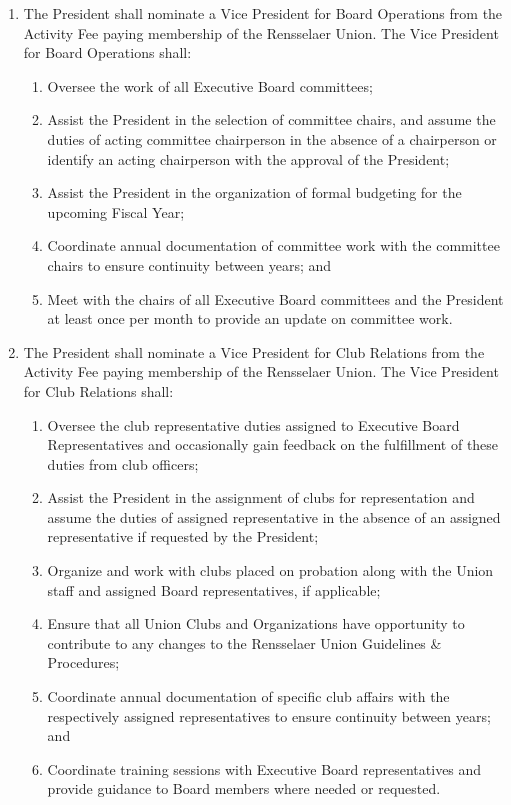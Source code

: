 \documentclass{uniondoc}
\begin{document}
\begin{enumerate}
\begin{enumerate}
  \end{enumerate}
\item The President shall nominate a Vice President for Board Operations from the Activity Fee paying membership of the Rensselaer Union. The Vice President for Board Operations shall:
  \begin{enumerate}
  \item Oversee the work of all Executive Board committees;
  \item Assist the President in the selection of committee chairs, and assume the duties of acting committee chairperson in the absence of a chairperson or identify an acting chairperson with the approval of the President;
  \item Assist the President in the organization of formal budgeting for the upcoming Fiscal Year;
  \item Coordinate annual documentation of committee work with the committee chairs to ensure continuity between years; and
  \item Meet with the chairs of all Executive Board committees and the President at least once per month to provide an update on committee work.
  \end{enumerate}
\item The President shall nominate a Vice President for Club Relations from the Activity Fee paying membership of the Rensselaer Union. The Vice President for Club Relations shall:
  \begin{enumerate}
  \item Oversee the club representative duties assigned to Executive Board Representatives and occasionally gain feedback on the fulfillment of these duties from club officers;
  \item Assist the President in the assignment of clubs for representation and assume the duties of assigned representative in the absence of an assigned representative if requested by the President;
  \item Organize and work with clubs placed on probation along with the Union staff and assigned Board representatives, if applicable;
  \item Ensure that all Union Clubs and Organizations have opportunity to contribute to any changes to the Rensselaer Union Guidelines \& Procedures;
  \item Coordinate annual documentation of specific club affairs with the respectively assigned representatives to ensure continuity between years; and
  \item Coordinate training sessions with Executive Board representatives and provide guidance to Board members where needed or requested.

\end{enumerate}
\end{enumerate}
\end{document}
